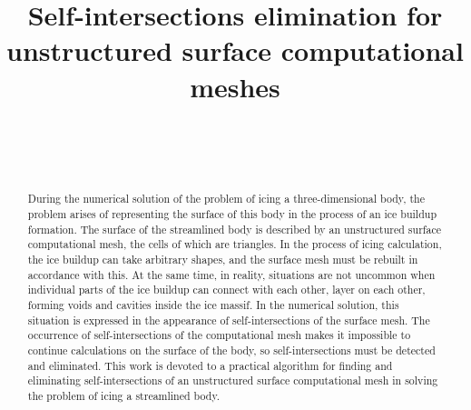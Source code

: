 \documentclass[
11pt,%
tightenlines,%
twoside,%
onecolumn,%
nofloats,%
nobibnotes,%
nofootinbib,%
superscriptaddress,%
noshowpacs,%
centertags]%
{revtex4}
\begin{document}

\title{Self-intersections elimination for unstructured surface computational meshes}

\author{~}

\author{~}



\begin{abstract}
During the numerical solution of the problem of icing a three-dimensional body, the problem arises of representing the surface of this body in the process of an ice buildup formation.
The surface of the streamlined body is described by an unstructured surface computational mesh, the cells of which are triangles.
In the process of icing calculation, the ice buildup can take arbitrary shapes, and the surface mesh must be rebuilt in accordance with this.
At the same time, in reality, situations are not uncommon when individual parts of the ice buildup can connect with each other, layer on each other, forming voids and cavities inside the ice massif.
In the numerical solution, this situation is expressed in the appearance of self-intersections of the surface mesh.
The occurrence of self-intersections of the computational mesh makes it impossible to continue calculations on the surface of the body, so self-intersections must be detected and eliminated.
This work is devoted to a practical algorithm for finding and eliminating self-intersections of an unstructured surface computational mesh in solving the problem of icing a streamlined body.
\end{abstract}


\end{document}
